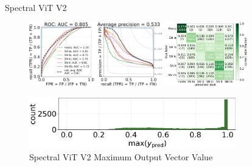 \begin{frame}{Spectral ViT V2}
    \begin{figure}[b!]
        \centering
        \includegraphics[height=2.8cm]{figures/Presentation/v2/vit_model_V2rocfulle_e26.png}
        \quad
        \includegraphics[height=2.8cm]{figures/Presentation/v2/vit_model_V2cmfull_e26.png}
        \caption{Spectral ViT V2 Classifier\label{fig:v2_qual}}

        \includegraphics[width=0.8\textwidth]{figures/Presentation/v2/vit_model_V2max_ypred_26.png}
        \caption{Spectral ViT V2 Maximum Output Vector Value\label{fig:v2_max}}
    \end{figure}
\end{frame}

